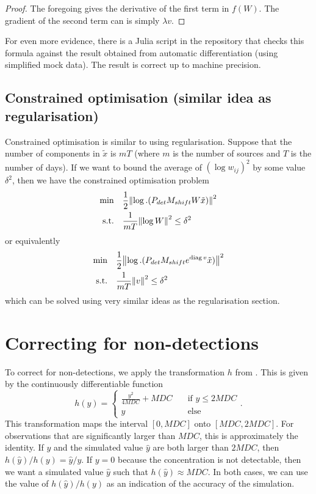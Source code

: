 \documentclass{article}
\begin{document}
\begin{proof}
The foregoing gives the derivative of the first term in $f(W)$. The gradient of the second term can is simply $\lambda v$.

\end{proof}
For even more evidence, there is a Julia script in the repository that checks this formula against the result obtained from automatic differentiation (using simplified mock data). The result is correct up to machine precision.

\subsection{Constrained optimisation (similar idea as regularisation)}
Constrained optimisation is similar to using regularisation.
Suppose that the number of components in $\tilde{x}$ is $m T$ (where $m$ is the number of sources and $T$ is the number of days).
If we want to bound the average of $(\log w_{ij})^2$ by some value $\delta^2$, then we have the constrained optimisation problem
\begin{align*}
    \min\quad & \frac{1}{2} \norm{\log.(P_{det} M_{shift} W \tilde{x})}^2 \\
    \text{s.t.}\quad & \frac{1}{mT} \norm{\log W}^2 \le \delta^2
\end{align*} 
or equivalently 
\begin{align*}
    \min\quad & \frac{1}{2} \norm{\log.(P_{det} M_{shift} e^{\mathrm{diag}\, v} \tilde{x})}^2 \\
    \text{s.t.}\quad & \frac{1}{mT} \norm{v}^2 \le \delta^2
\end{align*}
which can be solved using very similar ideas as the regularisation section.

\section{Correcting for non-detections}

To correct for non-detections, we apply the transformation $h$ from \cite{deMeutter2022uncertainty}. This is given by the continuously differentiable function
$$
h(y) = \begin{cases}
    \frac{y^2}{4MDC} + MDC &\quad \text{if } y \le 2MDC \\
    y &\quad \text{else}
\end{cases}
.$$
This transformation maps the interval $[0, MDC]$ onto $[MDC, 2MDC]$. For observations that are significantly larger than $MDC$, this is approximately the identity. If $y$ and the simulated value $\hat{y}$ are both larger than $2MDC$, then $h(\hat{y}) / h(y) = \hat{y} / y$. If $y = 0$ because the concentration is not detectable, then we want a simulated value $\hat{y}$ such that $h(\hat{y}) \approx MDC$. In both cases, we can use the value of $h(\hat{y}) / h(y)$ as an indication of the accuracy of the simulation.
\end{document}
